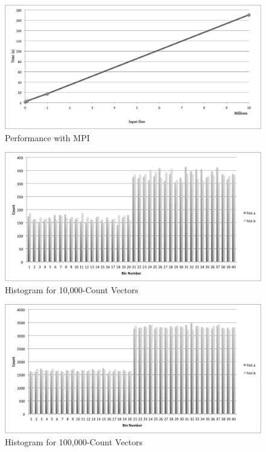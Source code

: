 \documentclass{acm_proc_article-sp}
\begin{document}

\begin{figure}[tbp]
  \centering
  \caption{Performance with MPI}
	\label{MPI}
  \includegraphics[width=40pc]{Pics/MPI.png}
\end{figure}


\begin{figure}[tbp]
  \centering
  \caption{Histogram for 10,000-Count Vectors}
	\label{hist10000}
  \includegraphics[width=40pc]{Pics/10000.png}
\end{figure}

\begin{figure}[tbp]
  \centering
  \caption{Histogram for 100,000-Count Vectors}
	\label{hist100000}
  \includegraphics[width=40pc]{Pics/100000.png}
\end{figure}
\end{document}
